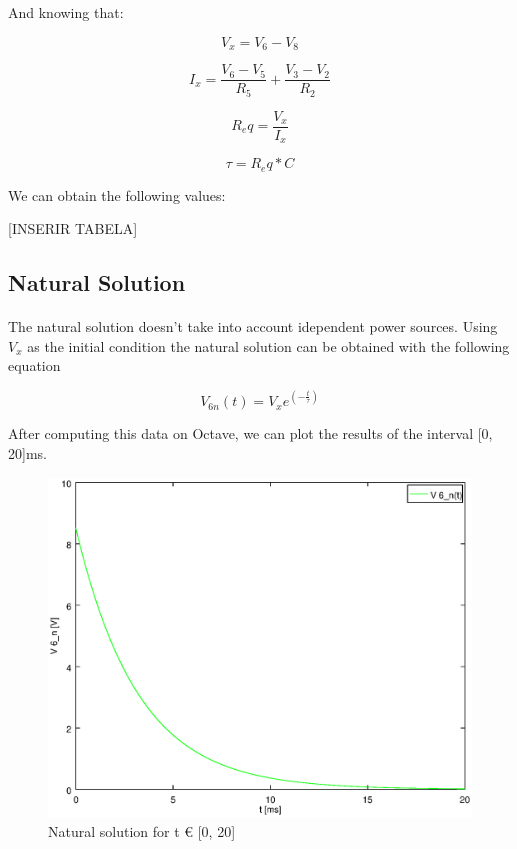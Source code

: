 And knowing that:

\begin{equation}
	V_x = V_6 - V_8
\end{equation}

\begin{equation}
	I_x = \frac{V_6 - V_5}{R_5} + \frac{V_3 - V_2}{R_2}
\end{equation}

\begin{equation}
	R_eq = \frac{V_x}{I_x}
\end{equation}

\begin{equation}
	\tau = R_eq * C
\end{equation}

We can obtain the following values:

[INSERIR TABELA]

\subsection{Natural Solution}

\paragraph{} The natural solution doesn't take into account idependent power sources. Using $V_x$ as the initial condition the natural solution can be obtained with the following equation

\begin{equation}
	V_{6n}(t) = V_x e^{(-\frac{t}{\tau})}
\end{equation}

After computing this data on Octave, we can plot the results of the interval [0, 20]ms.

\begin{figure}[!h]
	\centering
	\includegraphics[width=0.7\linewidth]{natural.eps}
	\caption{Natural solution for t € [0, 20]}
\end{figure}

